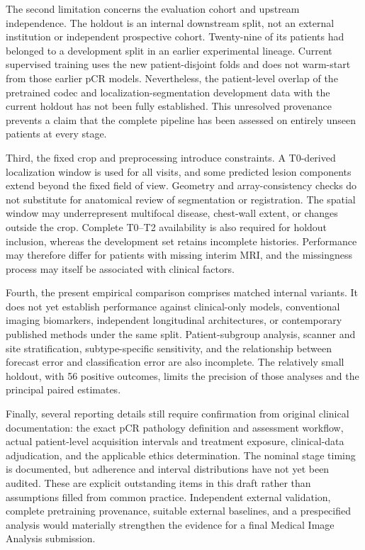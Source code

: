 The second limitation concerns the evaluation cohort and upstream independence. The holdout is an internal downstream split, not an external institution or independent prospective cohort. Twenty-nine of its patients had belonged to a development split in an earlier experimental lineage. Current supervised training uses the new patient-disjoint folds and does not warm-start from those earlier pCR models. Nevertheless, the patient-level overlap of the pretrained codec and localization-segmentation development data with the current holdout has not been fully established. This unresolved provenance prevents a claim that the complete pipeline has been assessed on entirely unseen patients at every stage.

Third, the fixed crop and preprocessing introduce constraints. A T0-derived localization window is used for all visits, and some predicted lesion components extend beyond the fixed field of view. Geometry and array-consistency checks do not substitute for anatomical review of segmentation or registration. The spatial window may underrepresent multifocal disease, chest-wall extent, or changes outside the crop. Complete T0--T2 availability is also required for holdout inclusion, whereas the development set retains incomplete histories. Performance may therefore differ for patients with missing interim MRI, and the missingness process may itself be associated with clinical factors.

Fourth, the present empirical comparison comprises matched internal variants. It does not yet establish performance against clinical-only models, conventional imaging biomarkers, independent longitudinal architectures, or contemporary published methods under the same split. Patient-subgroup analysis, scanner and site stratification, subtype-specific sensitivity, and the relationship between forecast error and classification error are also incomplete. The relatively small holdout, with 56 positive outcomes, limits the precision of those analyses and the principal paired estimates.

Finally, several reporting details still require confirmation from original clinical documentation: the exact pCR pathology definition and assessment workflow, actual patient-level acquisition intervals and treatment exposure, clinical-data adjudication, and the applicable ethics determination. The nominal stage timing is documented, but adherence and interval distributions have not yet been audited. These are explicit outstanding items in this draft rather than assumptions filled from common practice. Independent external validation, complete pretraining provenance, suitable external baselines, and a prespecified analysis would materially strengthen the evidence for a final Medical Image Analysis submission.
